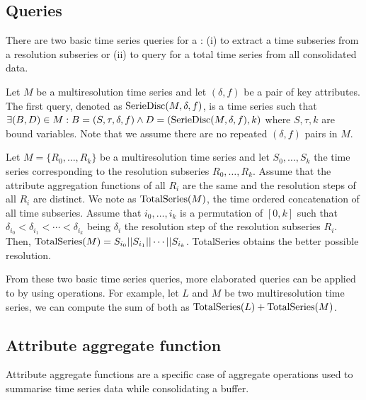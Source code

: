 \subsection{Queries}

There are two basic time series queries for a : (i) to
extract a time subseries from a resolution subseries or (ii) to query
for a total time series from all consolidated data.

Let $M$ be a multiresolution time series and let $(\delta,f)$ be a
pair of key attributes.  The first query, denoted as
$\operatorname{SerieDisc}(M,\delta,f)$, is a time series such that $\exists (B,D)
\in M: B=(S,\tau,\delta,f) \wedge D=(\operatorname{SerieDisc}(M,\delta,f), k) $
where $S,\tau,k$ are bound variables.  Note that we
assume there are no repeated $(\delta,f)$ pairs in $M$.

Let $M=\{R_0,\dots,R_k\}$ be a multiresolution time series and let
$S_0,\dots,S_k$ the time series corresponding to the resolution
subseries $R_0,\dots,R_k$. Assume that the attribute aggregation
functions of all $R_i$ are the same and the resolution steps of all
$R_i$ are distinct.
%
We note as $\operatorname{TotalSeries}(M)$, the time ordered concatenation of all
time subseries. Assume that $i_0,\dots,i_k$ is a permutation of
$[0,k]$ such that $\delta_{i_0} < \delta_{i_1} < \cdots <
\delta_{i_k}$ being $\delta_i$ the resolution step of the resolution
subseries $R_i$. Then, $\operatorname{TotalSeries}(M) = S_{i_0} || S_{i_1} || \cdots
|| S_{i_k}$.
%
TotalSeries obtains the better possible resolution.

From these two basic time series queries, more elaborated queries can
be applied to  by using  operations. For
example, let $L$ and $M$ be two multiresolution time series, we can
compute the sum of both as $\operatorname{TotalSeries}(L) + \operatorname{TotalSeries}(M)$.





\subsection{Attribute aggregate function}
\label{sec:model:interpolador}

Attribute aggregate functions are a specific case of 
aggregate operations used to summarise time series data while
consolidating a buffer.
%


